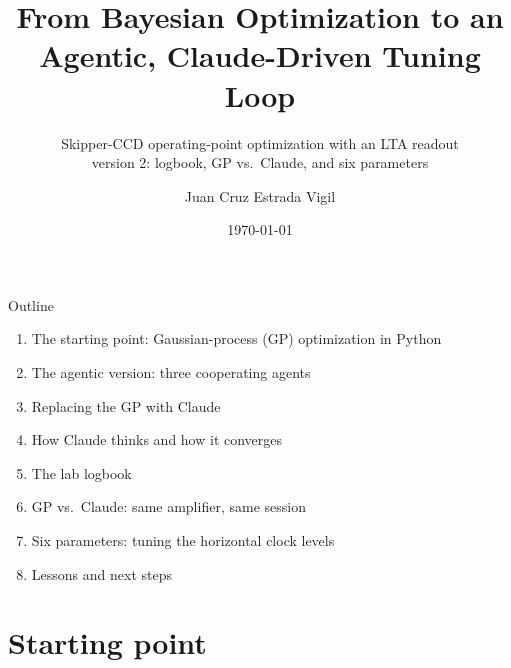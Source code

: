 \documentclass[aspectratio=169,10pt]{beamer}
\title{From Bayesian Optimization to an Agentic, Claude-Driven Tuning Loop}
\subtitle{Skipper-CCD operating-point optimization with an LTA readout\\[1mm]
          \small version 2: logbook, GP vs.\ Claude, and six parameters}
\author{Juan Cruz Estrada Vigil}
\institute{}
\date{\today}
\begin{document}
\begin{frame}
  \titlepage
\end{frame}

\begin{frame}{Outline}
  \begin{enumerate}
    \item The starting point: Gaussian-process (GP) optimization in Python
    \item The agentic version: three cooperating agents
    \item Replacing the GP with Claude
    \item How Claude thinks and how it converges
    \item The lab logbook
    \item GP vs.\ Claude: same amplifier, same session
    \item Six parameters: tuning the horizontal clock levels
    \item Lessons and next steps
  \end{enumerate}
\end{frame}

\section{Starting point}
\end{document}
